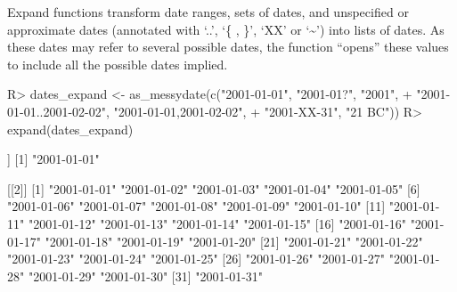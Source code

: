 \documentclass[
]{jss}
\begin{document}
Expand functions transform date ranges, sets of dates, and unspecified
or approximate dates (annotated with `..', `\{ , \}', `XX' or
`\textasciitilde{}') into lists of dates. As these dates may refer to
several possible dates, the function ``opens'' these values to include
all the possible dates implied.

\begin{CodeChunk}
\begin{CodeInput}
R> dates_expand <- as_messydate(c("2001-01-01", "2001-01?", "2001",
+                                "2001-01-01..2001-02-02", "{2001-01-01,2001-02-02}",
+                                "2001-XX-31", "21 BC"))
R> expand(dates_expand)
\end{CodeInput}
\begin{CodeOutput}
[[1]]
[1] "2001-01-01"

[[2]]
 [1] "2001-01-01" "2001-01-02" "2001-01-03" "2001-01-04" "2001-01-05"
 [6] "2001-01-06" "2001-01-07" "2001-01-08" "2001-01-09" "2001-01-10"
[11] "2001-01-11" "2001-01-12" "2001-01-13" "2001-01-14" "2001-01-15"
[16] "2001-01-16" "2001-01-17" "2001-01-18" "2001-01-19" "2001-01-20"
[21] "2001-01-21" "2001-01-22" "2001-01-23" "2001-01-24" "2001-01-25"
[26] "2001-01-26" "2001-01-27" "2001-01-28" "2001-01-29" "2001-01-30"
[31] "2001-01-31"


\end{CodeOutput}
\end{CodeChunk}
\end{document}

